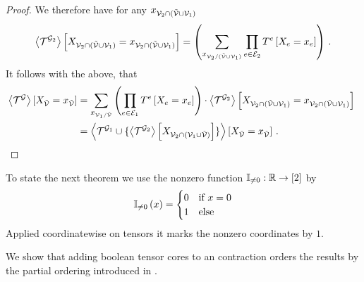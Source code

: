 \begin{proof}
	We therefore have for any $x_{\mathcal{V}_2\cap(\tilde{\mathcal{V}}\cup\mathcal{V}_1)}$
	\begin{align*}
		\left\langle \mathcal{T}^{\mathcal{G}_2}\right\rangle \left[ X_{\mathcal{V}_2\cap(\tilde{\mathcal{V}}\cup\mathcal{V}_1)}=x_{\mathcal{V}_2\cap(\tilde{\mathcal{V}}\cup\mathcal{V}_1)} \right] =
		 \left( \sum_{x_{\mathcal{V}_2/(\tilde{\mathcal{V}}\cup\mathcal{V}_1)}}  \prod_{e\in\mathcal{E}_2} T^{e}\left[X_{e}=x_{e}\right]  \right) \, .
	\end{align*}
	It follows with the above, that
	\begin{align*}
		\contractionof{\tnetof{\graph}}{\indexedcatvariableof{\secnodes}}
		& =  \sum_{\catindexof{\nodes_1/\secnodes}}  \left( \prod_{\edge\in\edges_1} \hypercoreofat{\edge}{\indexedcatvariableof{\edge}} \right) \cdot \sbcontractionof{\tnetof{\graph_2}}{\indexedcatvariableof{\nodes_2\cap(\secnodes\cup\nodes_1)}} \\
		& = \contractionof{\tnetof{\graph_1} \cup \{
			\contractionof{\tnetof{\graph_2}}{\catvariableof{\nodes_2\cap(\nodes_1\cup\secnodes)}}
		\}}{\indexedcatvariableof{\secnodes}}   \, .
	\end{align*}
\end{proof}







\label{sec:supportContractionEquations}


To state the next theorem we use the nonzero function $\mathbb{I}_{\neq0}: \mathbb{R} \rightarrow [2]$ by
\begin{align}
	\mathbb{I}_{\neq0}\left(x\right) = \begin{cases}
	0 & \text{if }x=0 \\
	1 & \text{else}
	\end{cases}
\end{align}
Applied coordinatewise on tensors it marks the nonzero coordinates by $1$.

We show that adding boolean tensor cores to an contraction orders the results by the partial ordering introduced in .

